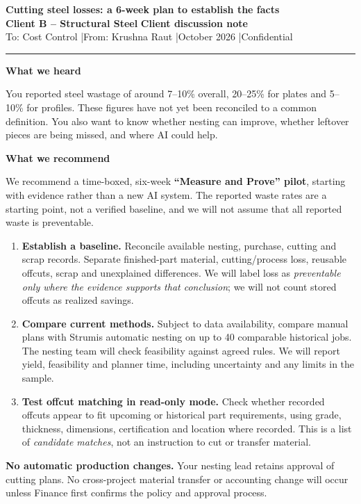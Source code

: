\documentclass[10pt,a4paper]{article}
\newcommand{\sectionlabel}[1]{\vspace{2pt}\textbf{#1}\par}
\begin{document}
\small

{\Large\bfseries Cutting steel losses: a 6-week plan to establish the facts}\\[2pt]
\textbf{Client B -- Structural Steel} \hfill \textbf{Client discussion note}\\
To: Cost Control \quad|\quad From: Krushna Raut \quad|\quad October 2026 \quad|\quad Confidential

\vspace{3pt}\hrule\vspace{4pt}

\sectionlabel{What we heard}
You reported steel wastage of around 7--10\% overall, 20--25\% for plates and 5--10\% for profiles. These figures have not yet been reconciled to a common definition. You also want to know whether nesting can improve, whether leftover pieces are being missed, and where AI could help.

\sectionlabel{What we recommend}
We recommend a time-boxed, six-week \textbf{``Measure and Prove'' pilot}, starting with evidence rather than a new AI system. The reported waste rates are a starting point, not a verified baseline, and we will not assume that all reported waste is preventable.

\begin{enumerate}
\item \textbf{Establish a baseline.} Reconcile available nesting, purchase, cutting and scrap records. Separate finished-part material, cutting/process loss, reusable offcuts, scrap and unexplained differences. We will label loss as \emph{preventable only where the evidence supports that conclusion}; we will not count stored offcuts as realized savings.
\item \textbf{Compare current methods.} Subject to data availability, compare manual plans with Strumis automatic nesting on up to 40 comparable historical jobs. The nesting team will check feasibility against agreed rules. We will report yield, feasibility and planner time, including uncertainty and any limits in the sample.
\item \textbf{Test offcut matching in read-only mode.} Check whether recorded offcuts appear to fit upcoming or historical part requirements, using grade, thickness, dimensions, certification and location where recorded. This is a list of \emph{candidate matches}, not an instruction to cut or transfer material.
\end{enumerate}

\textbf{No automatic production changes.} Your nesting lead retains approval of cutting plans. No cross-project material transfer or accounting change will occur unless Finance first confirms the policy and approval process.
\end{document}
